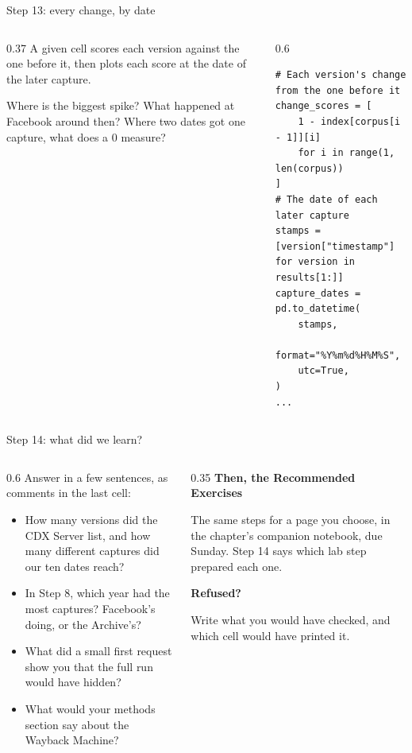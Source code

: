 \documentclass[9pt,aspectratio=169]{beamer}
\begin{document}
\begin{frame}[fragile]{Step 13: every change, by date}
    \begin{columns}[T]
        \begin{column}{0.37\textwidth}
            A given cell scores each version against the one before it, then plots each score at the date of the later capture.

            \medskip
            Where is the biggest spike? What happened at Facebook around then? Where two dates got one capture, what does a 0 measure?
        \end{column}
        \begin{column}{0.6\textwidth}
\begin{lstlisting}
# Each version's change from the one before it
change_scores = [
    1 - index[corpus[i - 1]][i]
    for i in range(1, len(corpus))
]
# The date of each later capture
stamps = [version["timestamp"] for version in results[1:]]
capture_dates = pd.to_datetime(
    stamps,
    format="%Y%m%d%H%M%S",
    utc=True,
)
...
\end{lstlisting}
        \end{column}
    \end{columns}
\end{frame}

\begin{frame}{Step 14: what did we learn?}
    \begin{columns}[T]
        \begin{column}{0.6\textwidth}
            Answer in a few sentences, as comments in the last cell:
            \begin{itemize}
                \item How many versions did the CDX Server list, and how many different captures did our ten dates reach?
                \item In Step 8, which year had the most captures? Facebook's doing, or the Archive's?
                \item What did a small first request show you that the full run would have hidden?
                \item What would your methods section say about the Wayback Machine?
            \end{itemize}
        \end{column}
        \begin{column}{0.35\textwidth}
            \textbf{Then, the Recommended Exercises}\\[2pt]
            {\footnotesize The same steps for a page you choose, in the chapter's companion notebook, due Sunday. Step 14 says which lab step prepared each one.\par}
            \medskip
            \textbf{Refused?}\\[2pt]
            {\footnotesize Write what you would have checked, and which cell would have printed it.\par}
        \end{column}
    \end{columns}
\end{frame}
\end{document}
